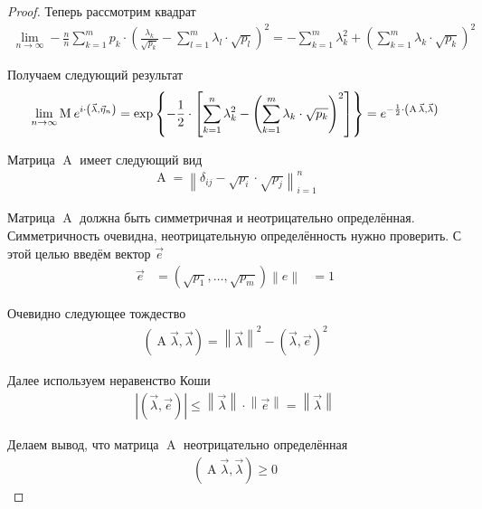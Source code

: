 \begin{proof}
  Теперь рассмотрим квадрат
  \begin{align*}
      \lim_{n \to \infty} -\frac{n}{n}\sum_{k=1}^{m} p_k
      \cdot \left( \frac{\lambda_k}{\sqrt{p_k}}
      - \sum_{l=1}^{m}\lambda_l \cdot \sqrt{p_l} \right)^2
      = - \sum_{k=1}^{m}\lambda_k^2
      + \left( \sum_{k=1}^{m}\lambda_k \cdot \sqrt{p_k} \right)^2
  \end{align*}

  Получаем следующий результат
  \begin{align*}
      \lim_{n \to \infty} \operatorname{M}_{} e^{
      i \cdot \left( \vec{\lambda}, \vec{\eta}_n \right)}
      = \exp{\left\{ - \frac{1}{2} \cdot \left[ \sum_{k=1}^{n}\lambda_k^2
          - \left( \sum_{k=1}^{m}\lambda_k \cdot \sqrt{p_k}
        \right)^2\right] \right\}}
      = e^{-\frac{1}{2} \cdot \left(
          \operatorname{A} \vec{\lambda}, \vec{\lambda} \right)}
  \end{align*}

  Матрица $\operatorname{A}$ имеет следующий вид
  \begin{align*}
      \operatorname{A}
      = \left\| \delta_{ij} - \sqrt{p_i} \cdot \sqrt{p_j} \right\|_{i=1}^n
  \end{align*}

  Матрица $\operatorname{A}$ должна быть симметричная и неотрицательно
  определённая. Симметричность очевидна, неотрицательную определённость
  нужно проверить. С этой целью введём вектор $\vec{e}$
  \begin{align*}
      \vec{e} &= \left( \sqrt{p_1}, \dots, \sqrt{p_m} \right)
      \left\| e \right\| &= 1
  \end{align*}

  Очевидно следующее тождество
  \begin{align*}
      \left( \operatorname{A} \vec{\lambda}, \vec{\lambda} \right)
      = \left\| \vec{\lambda} \right\|^2
      - \left( \vec{\lambda}, \vec{e} \right)^2
  \end{align*}

  Далее используем неравенство Коши
  \begin{align*}
      \left| \left( \vec{\lambda}, \vec{e} \right) \right|
      \le \left\| \vec{\lambda} \right\| \cdot \left\| \vec{e} \right\|
      = \left\| \vec{\lambda} \right\|
  \end{align*}

  Делаем вывод, что матрица $\operatorname{A}$ неотрицательно определённая
  \begin{align*}
      \left( \operatorname{A} \vec{\lambda}, \vec{\lambda} \right) \ge 0
  \end{align*}


\end{proof}
